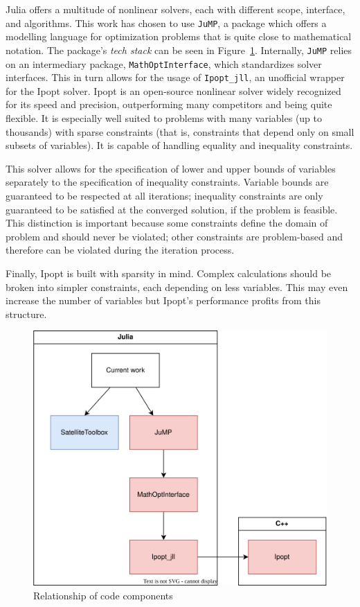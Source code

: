 Julia offers a multitude of nonlinear solvers, each with different scope, interface, and algorithms. This work has chosen to use \texttt{JuMP}, a package which offers a modelling language for optimization problems that is quite close to mathematical notation. The package's \textit{tech stack} can be seen in Figure~\ref{fig:tech_stack}. Internally, \texttt{JuMP} relies on an intermediary package, \texttt{MathOptInterface}, which standardizes solver interfaces. This in turn allows for the usage of \texttt{Ipopt\_jll}, an unofficial wrapper for the Ipopt solver. Ipopt is an open-source nonlinear solver widely recognized for its speed and precision, outperforming many competitors and being quite flexible. It is especially well suited to problems with many variables (up to thousands) with sparse constraints (that is, constraints that depend only on small subsets of variables). It is capable of handling equality and inequality constraints.

This solver allows for the specification of lower and upper bounds of variables separately to the specification of inequality constraints. Variable bounds are guaranteed to be respected at all iterations; inequality constraints are only guaranteed to be satisfied at the converged solution, if the problem is feasible. This distinction is important because some constraints define the domain of problem and should never be violated; other constraints are problem-based and therefore can be violated during the iteration process.

Finally, Ipopt is built with sparsity in mind. Complex calculations should be broken into simpler constraints, each depending on less variables. This may even increase the number of variables but Ipopt's performance profits from this structure.

\begin{figure}[htbp]
    \centering
        \includegraphics[width=\textwidth]{img/techstack.png}
    \caption{Relationship of code components}
    \label{fig:tech_stack}
\end{figure}

